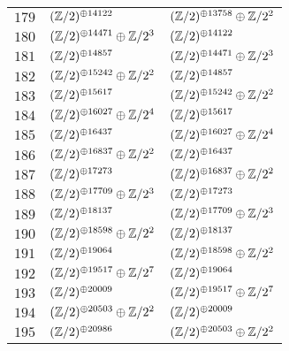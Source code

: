\begin{supertabular}{|c|p{5.5cm}|p{5.5cm}|}
$179$%
&$(\mathbb{Z}/2)^{\oplus14122}$%
&$(\mathbb{Z}/2)^{\oplus13758}\oplus\mathbb{Z}/2^{2}$\\

$180$%
&$(\mathbb{Z}/2)^{\oplus14471}\oplus\mathbb{Z}/2^{3}$%
&$(\mathbb{Z}/2)^{\oplus14122}$\\

$181$%
&$(\mathbb{Z}/2)^{\oplus14857}$%
&$(\mathbb{Z}/2)^{\oplus14471}\oplus\mathbb{Z}/2^{3}$\\

$182$%
&$(\mathbb{Z}/2)^{\oplus15242}\oplus\mathbb{Z}/2^{2}$%
&$(\mathbb{Z}/2)^{\oplus14857}$\\

$183$%
&$(\mathbb{Z}/2)^{\oplus15617}$%
&$(\mathbb{Z}/2)^{\oplus15242}\oplus\mathbb{Z}/2^{2}$\\

$184$%
&$(\mathbb{Z}/2)^{\oplus16027}\oplus\mathbb{Z}/2^{4}$%
&$(\mathbb{Z}/2)^{\oplus15617}$\\

$185$%
&$(\mathbb{Z}/2)^{\oplus16437}$%
&$(\mathbb{Z}/2)^{\oplus16027}\oplus\mathbb{Z}/2^{4}$\\

$186$%
&$(\mathbb{Z}/2)^{\oplus16837}\oplus\mathbb{Z}/2^{2}$%
&$(\mathbb{Z}/2)^{\oplus16437}$\\

$187$%
&$(\mathbb{Z}/2)^{\oplus17273}$%
&$(\mathbb{Z}/2)^{\oplus16837}\oplus\mathbb{Z}/2^{2}$\\

$188$%
&$(\mathbb{Z}/2)^{\oplus17709}\oplus\mathbb{Z}/2^{3}$%
&$(\mathbb{Z}/2)^{\oplus17273}$\\

$189$%
&$(\mathbb{Z}/2)^{\oplus18137}$%
&$(\mathbb{Z}/2)^{\oplus17709}\oplus\mathbb{Z}/2^{3}$\\

$190$%
&$(\mathbb{Z}/2)^{\oplus18598}\oplus\mathbb{Z}/2^{2}$%
&$(\mathbb{Z}/2)^{\oplus18137}$\\

$191$%
&$(\mathbb{Z}/2)^{\oplus19064}$%
&$(\mathbb{Z}/2)^{\oplus18598}\oplus\mathbb{Z}/2^{2}$\\

$192$%
&$(\mathbb{Z}/2)^{\oplus19517}\oplus\mathbb{Z}/2^{7}$%
&$(\mathbb{Z}/2)^{\oplus19064}$\\

$193$%
&$(\mathbb{Z}/2)^{\oplus20009}$%
&$(\mathbb{Z}/2)^{\oplus19517}\oplus\mathbb{Z}/2^{7}$\\

$194$%
&$(\mathbb{Z}/2)^{\oplus20503}\oplus\mathbb{Z}/2^{2}$%
&$(\mathbb{Z}/2)^{\oplus20009}$\\

$195$%
&$(\mathbb{Z}/2)^{\oplus20986}$%
&$(\mathbb{Z}/2)^{\oplus20503}\oplus\mathbb{Z}/2^{2}$\\


\end{supertabular}
